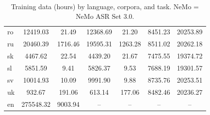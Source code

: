 \begin{table}[ht]
\begin{tabular}{l|cc|cc|cc}
ro & 12419.03 & 21.49 & 12368.69 & 21.20 & 8451.23 & 20253.89 \\
ru & 20460.39 & 1716.46 & 19595.31 & 1263.28 & 8511.02 & 20262.18 \\
sk & 4467.62 & 22.54 & 4439.20 & 21.67 & 7475.55 & 19374.72 \\
sl & 5851.59 & 9.41 & 5826.37 & 9.53 & 7688.19 & 19301.57 \\
sv & 10014.93 & 10.09 & 9991.90 & 9.88 & 8735.76 & 20253.51 \\
uk & 932.67 & 191.06 & 613.14 & 177.06 & 8482.46 & 20236.27 \\
en & 275548.32 & 9003.94 & -- & -- & -- & -- \\
\hline
\end{tabular}
\caption{Training data (hours) by language, corpora, and task. NeMo = NeMo ASR Set 3.0.}
\label{tab:big-multicol}
\end{table}

